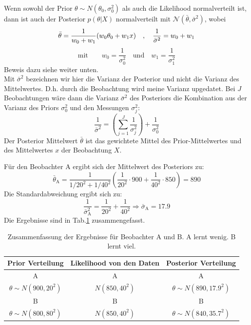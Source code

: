 Wenn sowohl der Prior $\theta \sim N(\theta_0,\sigma_0^2)$ als auch die 
Likelihood normalverteilt ist, dann ist auch der Posterior $p(\theta|X)$ normalverteilt mit $\mathcal{N}(\bar{\theta},\bar{\sigma}^2)$, wobei
\begin{equation}
\bar{\theta} = \frac{1}{w_0+w_1}(w_0 \theta_0 + w_1 x)\quad, \quad
\frac{1}{\bar{\sigma}^2}=w_0 + w_1 \\
\label{eq:prior_Normal}
\end{equation}
\[
\mathrm{mit} \quad \quad w_0 = \frac{1}{\sigma_0^2} \quad \mathrm{und} \quad w_1=\frac{1}{\sigma_1^2}
\]
Beweis dazu siehe weiter unten. \\
Mit $\bar{\sigma}^2$ bezeichnen wir hier die Varianz der Posterior 
und nicht die Varianz des Mittelwertes. D.h. durch die Beobachtung
wird meine Varianz upgedatet. Bei $J$ Beobachtungen wäre dann die Varianz $\bar{\sigma}^2$ des Posteriors die Kombination aus der
Varianz des Priors $\sigma_0^2$ und den Messungen $\sigma_j^2$:
\[
\frac{1}{\bar{\sigma}^2} = \left( \sum_{j=1}^{J} 
\frac{1}{\sigma_j^2}\right) + \frac{1}{\sigma_0^2} 
\] 
Der Posterior Mittelwert $\bar{\theta}$ ist das gewichtete Mittel des Prior-Mittelwertes
und des Mittelwertes $x$ der Beobachtung $X$. 

Für den Beobachter A ergibt sich der Mittelwert des Posteriors zu:
\[
\bar{\theta}_\mathrm{A} = \frac{1}{1/20^2+1/40^2}\left( \frac{1}{20^2}\cdot 900 + 
 \frac{1}{40^2}\cdot 850  \right) = 890
\]
Die Standardabweichung ergibt sich zu: 
\[
\frac{1}{\bar{\sigma}_\mathrm{A}^2}=\frac{1}{20^2} + \frac{1}{40^2} \Rightarrow
\bar{\sigma}_\mathrm{A} = 17.9
\]
Die Ergebnisse sind in Tab.\ref{tab:Ergebnisse des Beispiels} zusammengefasst.
\begin{table}[!h]
	\caption{Zusammenfassung der Ergebnisse für Beobachter A und B. A lernt 
	wenig. B lernt viel.}
	\centering
	\begin{tabular}{c c c}  \hline 
		Prior Verteilung & Likelihood von den Daten & Posterior Verteilung\\
		\hline
		A & A & A \\
		$\theta \sim N(900, 20^2)$ &$N(850,40^2)$ & $\theta \sim N(890, 17.9^2)$ \\ 
		B &B & B \\
		$\theta \sim N(800, 80^2)$ &$N(850,40^2)$ & $\theta \sim N(840, 35.7^2)$ \\
		\hline 
	\end{tabular}
	\label{tab:Ergebnisse des Beispiels}
\end{table}

